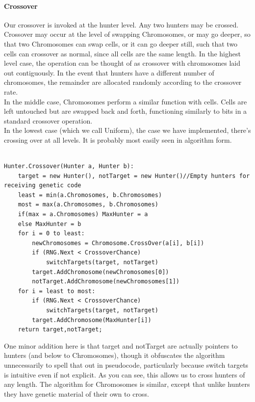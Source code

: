\paragraph{Crossover}
Our crossover is invoked at the hunter level.  Any two hunters may be crossed.  Crossover may occur at the level of swapping Chromosomes, or may go deeper, so that two Chromosomes can swap cells, or it can go deeper still, such that two cells can crossover as normal, since all cells are the same length.  
In the highest level case, the operation can be thought of as crossover with chromosomes laid out contiguously.  In the event that hunters have a different number of chromosomes, the remainder are allocated randomly according to the crossover rate.\\
In the middle case, Chromosomes perform a similar function with cells.  Cells are left untouched but are swapped back and forth, functioning similarly to bits in a standard crossover operation.  \\
In the lowest case (which we call Uniform), the case we have implemented, there's crossing over at all levels. It is probably most easily seen in algorithm form.\\\\
\begin{minipage}{\linewidth}
\begin{lstlisting}[language = algorithm]
Hunter.Crossover(Hunter a, Hunter b):
	target = new Hunter(), notTarget = new Hunter()//Empty hunters for receiving genetic code
	least = min(a.Chromosomes, b.Chromosomes)
	most = max(a.Chromosomes, b.Chromosomes)
	if(max = a.Chromosomes) MaxHunter = a
	else MaxHunter = b
	for i = 0 to least:
		newChromosomes = Chromosome.CrossOver(a[i], b[i])
		if (RNG.Next < CrossoverChance)
			switchTargets(target, notTarget)
		target.AddChromosome(newChromosomes[0])
		notTarget.AddChromosome(newChromosomes[1])
	for i = least to most:
		if (RNG.Next < CrossoverChance) 
			switchTargets(target, notTarget)	
		target.AddChromosome(MaxHunter[i])
	return target,notTarget;
\end{lstlisting}
\end{minipage}

One minor addition here is that target and notTarget are actually pointers to hunters (and below to Chromosomes), though it obfuscates the algorithm unnecessarily to spell that out in pseudocode, particularly because switch targets is intuitive even if not explicit.  
As you can see, this allows us to cross hunters of any length.  The algorithm for Chromosomes is similar, except that unlike hunters they have genetic material of their own to cross.

